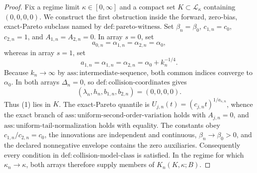 \documentclass{article}
\begin{document}
\begin{proof}
Fix a regime limit \(\kappa\in[0,\infty]\) and a compact set \(K\subset\mathcal L_\kappa\) containing \((0,0,0,0)\).  We construct the first obstruction inside the forward, zero-bias, exact-Pareto subclass named by \(\mathrm{def{:}pareto\text{-}witness}\).  Set \(\beta_n=\beta_0\), \(c_{1,n}=c_0\), \(c_{2,n}=1\), and \(A_{1,n}=A_{2,n}=0\).  In array \(s=0\), set
\[
 a_{0,n}=\alpha_{1,n}=\alpha_{2,n}=\alpha_0,
\]
whereas in array \(s=1\), set
\[
 a_{1,n}=\alpha_{1,n}=\alpha_{2,n}=\alpha_0+k_n^{-1/4}.
\]
Because \(k_n\to\infty\) by \(\mathrm{ass{:}intermediate\text{-}sequence}\), both common indices converge to \(\alpha_0\).  In both arrays \(\Delta_n=0\), so \(\mathrm{def{:}collision\text{-}coordinates}\) gives
\[
 (\lambda_n,h_n,b_{1,n},b_{2,n})=(0,0,0,0). \tag{1}
\]
Thus (1) lies in \(K\).  The exact-Pareto quantile is \(U_{j,n}(t)=(c_{j,n}t)^{1/a_{s,n}}\), whence the exact branch of \(\mathrm{ass{:}uniform\text{-}second\text{-}order\text{-}variation}\) holds with \(A_{j,n}=0\), and \(\mathrm{ass{:}uniform\text{-}tail\text{-}normalization}\) holds with equality.  The constants obey \(c_{1,n}/c_{2,n}=c_0\), the innovations are independent and continuous, \(\beta_n\to\beta_0>0\), and the declared nonnegative envelope contains the zero auxiliaries.  Consequently every condition in \(\mathrm{def{:}collision\text{-}model\text{-}class}\) is satisfied.  In the regime for which \(\kappa_n\to\kappa\), both arrays therefore supply members of \(K_n(K,\kappa;B)\).


\end{proof}
\end{document}
